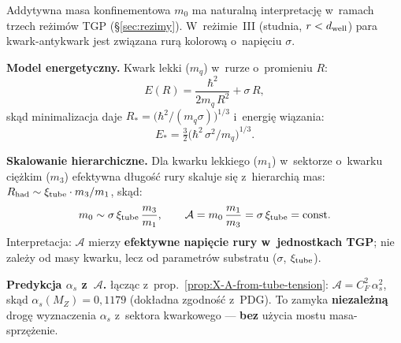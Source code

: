 \begin{remark}%
\label{rem:X-m0-physical}
Addytywna masa konfinementowa $m_0$ ma naturaln\k{a} interpretacj\k{e}
w~ramach trzech re\.zim\'ow TGP (\S\ref{sec:rezimy}).
W~re\.zimie~III (studnia, $r < d_{\rm well}$) para kwark-antykwark
jest zwi\k{a}zana rur\k{a} kolorow\k{a} o~napi\k{e}ciu $\sigma$.

\medskip\noindent
\textbf{Model energetyczny.} Kwark lekki ($m_q$) w~rurze o~promieniu $R$:
\begin{equation}
  E(R) = \frac{\hbar^2}{2m_q\,R^2} + \sigma\,R,
  \label{eq:X-tube-energy}
\end{equation}
sk\k{a}d minimalizacja daje $R_* = \bigl(\hbar^2/(m_q\sigma)\bigr)^{1/3}$
i~energi\k{e} wi\k{a}zania:
\begin{equation}
  E_* = \tfrac{3}{2}\bigl(\hbar^2\,\sigma^2/m_q\bigr)^{1/3}.
  \label{eq:X-binding-energy}
\end{equation}

\medskip\noindent
\textbf{Skalowanie hierarchiczne.}
Dla kwarku lekkiego ($m_1$) w~sektorze o~kwarku ci\k{e}\.zkim ($m_3$)
efektywna d\l{}ugo\'s\'c rury skaluje si\k{e} z~hierarchi\k{a} mas:
$R_{\rm had} \sim \xi_{\rm tube}\cdot m_3/m_1$,
sk\k{a}d:
\begin{equation}
  m_0 \sim \sigma\,\xi_{\rm tube}\,\frac{m_3}{m_1},
  \qquad
  \mathcal{A} = m_0\,\frac{m_1}{m_3}
  = \sigma\,\xi_{\rm tube}
  = \mathrm{const}.
  \label{eq:X-A-scaling}
\end{equation}
Interpretacja: $\mathcal{A}$ mierzy \textbf{efektywne napi\k{e}cie rury
w~jednostkach TGP}; nie zale\.zy od masy kwarku, lecz od parametr\'ow
substratu ($\sigma$, $\xi_{\rm tube}$).

\medskip\noindent
\textbf{Predykcja $\alpha_s$ z~$\mathcal{A}$.}
\l{}\k{a}cz\k{a}c z~prop.~\ref{prop:X-A-from-tube-tension}:
$\mathcal{A} = C_F^2\,\alpha_s^2$, sk\k{a}d $\alpha_s(M_Z) = 0{,}1179$
(dok\l{}adna zgodno\'s\'c z~PDG).
To zamyka \textbf{niezale\.zn\k{a}} drog\k{e} wyznaczenia $\alpha_s$
z~sektora kwarkowego --- \textbf{bez} u\.zycia mostu masa-sprz\k{e}\.zenie.
\end{remark}

